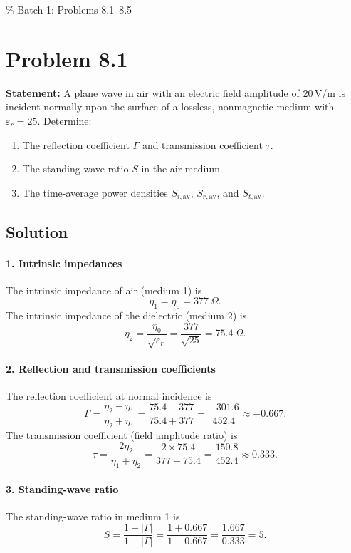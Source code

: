\% Batch 1: Problems 8.1--8.5
\section*{Problem 8.1}
\textbf{Statement:} A plane wave in air with an electric field amplitude of $20\,$V/m is incident normally upon the surface of a lossless, nonmagnetic medium with $\varepsilon_r = 25$. Determine:
\begin{enumerate}
  \item The reflection coefficient $\Gamma$ and transmission coefficient $\tau$.
  \item The standing-wave ratio $S$ in the air medium.
  \item The time-average power densities $S_{i,\mathrm{av}}$, $S_{r,\mathrm{av}}$, and $S_{t,\mathrm{av}}$.
\end{enumerate}

\subsection*{Solution}
\paragraph{1. Intrinsic impedances}
The intrinsic impedance of air (medium 1) is
\[
\eta_1 = \eta_0 = 377\ \Omega.
\]
The intrinsic impedance of the dielectric (medium 2) is
\[
\eta_2 = \frac{\eta_0}{\sqrt{\varepsilon_r}}
       = \frac{377}{\sqrt{25}}
       = 75.4\ \Omega.
\]

\paragraph{2. Reflection and transmission coefficients}
The reflection coefficient at normal incidence is
\[
\Gamma = \frac{\eta_2 - \eta_1}{\eta_2 + \eta_1}
       = \frac{75.4 - 377}{75.4 + 377}
       = \frac{-301.6}{452.4}
       \approx -0.667.
\]
The transmission coefficient (field amplitude ratio) is
\[
\tau = \frac{2\eta_2}{\eta_1 + \eta_2}
     = \frac{2 \times 75.4}{377 + 75.4}
     = \frac{150.8}{452.4}
     \approx 0.333.
\]

\paragraph{3. Standing-wave ratio}
The standing-wave ratio in medium 1 is
\[
S = \frac{1 + |\Gamma|}{1 - |\Gamma|}
  = \frac{1 + 0.667}{1 - 0.667}
  = \frac{1.667}{0.333}
  = 5.
\]

